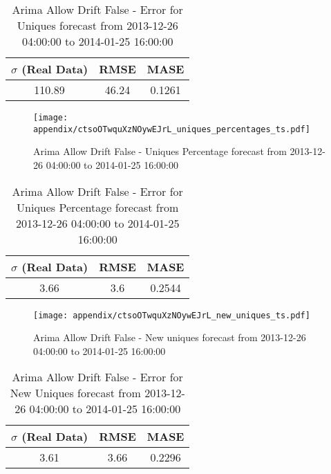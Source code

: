 \begin{table}[H]
\centering
\footnotesize
\begin{tabular}{ccc}
$\sigma$ (Real Data) & RMSE & MASE   \\ \hline
110.89 & 46.24 & 0.1261 \\
\end{tabular}

\vspace{0.5cm}

\caption{
Arima Allow Drift False - Error for Uniques forecast from 2013-12-26 04:00:00 to 2014-01-25 16:00:00}
\end{table}

\begin{figure}[H] \begin{center} \leavevmode
\texttt{[image: appendix/ctsoOTwquXzNOywEJrL\_uniques\_percentages\_ts.pdf]} \caption{
Arima Allow Drift False - Uniques Percentage forecast from 2013-12-26 04:00:00 to 2014-01-25 16:00:00} \label{fig:appendix/ctsoOTwquXzNOywEJrL_uniques_percentages_ts.pdf} \end{center}
\end{figure}

\begin{table}[H]
\centering
\footnotesize
\begin{tabular}{ccc}
$\sigma$ (Real Data) & RMSE & MASE   \\ \hline
3.66 & 3.6 & 0.2544 \\
\end{tabular}

\vspace{0.5cm}

\caption{
Arima Allow Drift False - Error for Uniques Percentage forecast from 2013-12-26 04:00:00 to 2014-01-25 16:00:00}
\end{table}

\begin{figure}[H] \begin{center} \leavevmode
\texttt{[image: appendix/ctsoOTwquXzNOywEJrL\_new\_uniques\_ts.pdf]} \caption{
Arima Allow Drift False - New uniques forecast from 2013-12-26 04:00:00 to 2014-01-25 16:00:00} \label{fig:appendix/ctsoOTwquXzNOywEJrL_new_uniques_ts.pdf} \end{center}
\end{figure}

\begin{table}[H]
\centering
\footnotesize
\begin{tabular}{ccc}
$\sigma$ (Real Data) & RMSE & MASE   \\ \hline
3.61 & 3.66 & 0.2296 \\
\end{tabular}

\vspace{0.5cm}

\caption{
Arima Allow Drift False - Error for New Uniques forecast from 2013-12-26 04:00:00 to 2014-01-25 16:00:00}
\end{table}

